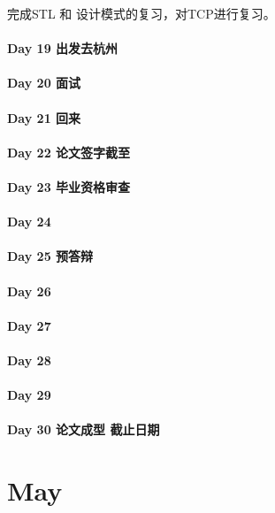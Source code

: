 \documentclass[UTF8,a4paper,8pt]{ctexart}
\begin{document}
	 	 完成STL 和 设计模式的复习，对TCP进行复习。
	 	 
 	 \paragraph{Day 19  出发去杭州    \quad     }
 	 \paragraph{Day 20  面试    \quad     }
 	 \paragraph{Day 21  回来    \quad     }
 	 \paragraph{Day 22  论文签字截至   \quad     }
 	 \paragraph{Day 23  毕业资格审查   \quad     }
 	 \paragraph{Day 24      \quad     }
 	 \paragraph{Day 25  预答辩    \quad     }
 	 \paragraph{Day 26      \quad     }
 	 \paragraph{Day 27      \quad     }
 	 \paragraph{Day 28      \quad     }
 	 \paragraph{Day 29      \quad     }   
 	 \paragraph{Day 30  论文成型 截止日期    \quad     }
\section{May}
\end{document}
